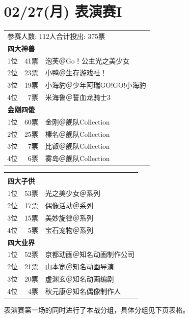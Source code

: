 
\section{02/27(月) 表演赛I}

{\kai\begin{tabular}{rrl}
\multicolumn{3}{l}{参赛人数: 112人\quad 合计投出: 375票} \\
\multicolumn{3}{l}{\bfseries 四大神兽 } \\
1位 & 41票 & 泡芙＠Go！公主光之美少女 \\
2位 & 23票 & 小鸭＠生存游戏社！ \\
3位 & 19票 & 小海豹＠少年阿瑞GO!GO!小海豹 \\
4位 & 7票 & 米海鲁＠誓血龙骑士3 \\
\multicolumn{3}{l}{\bfseries 金刚四傻 } \\
1位 & 60票 & 金刚＠舰队Collection \\
2位 & 25票 & 榛名＠舰队Collection \\
3位 & 7票 & 比叡＠舰队Collection \\
4位 & 6票 & 雾岛＠舰队Collection \\
\end{tabular}\begin{tabular}{rrl}
\multicolumn{3}{l}{} \\
\multicolumn{3}{l}{\bfseries 四大子供 } \\
1位 & 53票 & 光之美少女＠系列 \\
2位 & 17票 & 偶像活动＠系列 \\
3位 & 15票 & 美妙旋律＠系列 \\
4位 & 5票 & 宝石宠物＠系列 \\
\multicolumn{3}{l}{\bfseries 四大业界 } \\
1位 & 52票 & 京都动画＠知名动画制作公司 \\
2位 & 21票 & 山本宽＠知名动画导演 \\
3位 & 20票 & 虚渊玄＠知名动画编剧 \\
4位 & 4票 & 秋元康＠知名偶像制作人 \\
\end{tabular}}

\begin{center}
  \quad
\end{center}

表演赛第一场的同时进行了本战分组，具体分组见下页表格。

\newpage
{}


